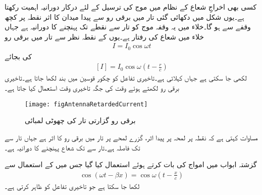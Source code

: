 کسی بھی اخراجِ شعاع کے نظام میں موج کی ترسیل کے لئے درکار دورانیہ اہمیت رکھتا ہے۔یوں شکل  میں دکھائی گئی تار میں برقی رو سے پیدا میدان کا اثر نقطہ  پر کچھ وقفے سے ہو گا۔خلاء میں یہ وقفہ موج کو تار سے نقطے تک پہنچنے کا دورانیہ  ہے جہاں
  خلاء میں  شعاع کی رفتار ہے۔یوں  کے نقطہ نظر سے تار میں برقی رو
\begin{align}
I=I_0 \cos \omega t
\end{align} 
کی بجائے
\begin{align}\label{مساوات_اینٹینا_تاخیری_رو}
[I]=I_0 \cos \omega  \left (t-\frac{r}{c} \right)
\end{align} 
لکھی جا سکتی ہے جہاں   کہلاتی ہے۔تاخیری تفاعل کو چکور قوسین میں بند لکھا جاتا ہے۔تاخیری برقی رو لکھتے ہوئے وقت  کی جگہ تاخیری وقت  استعمال کیا جاتا ہے۔

\begin{figure}
\centering
\texttt{[image: figAntennaRetardedCurrent]}
\caption{برقی رو گزارتی تار کی چھوٹی لمبائی}
\label{شکل_اینٹینا_تاخیری_رو}
\end{figure}

مساوات  کہتی ہے کہ نقطہ  پر لمحہ   پر پیدا اثر،  گزرے  لمحے  پر تار میں برقی رو کا اثر ہے جہاں تار سے  تک فاصلہ  ہے۔تار سے  تک شعاع پہنچنے کا دورانیہ  ہے۔

گزشتہ ابواب میں امواج کی بات کرتے ہوئے  استعمال کیا گیا جس میں  کے استعمال سے
\begin{align}
\cos (\omega t -\beta x)=\cos \omega\left( t- \frac{x}{c}\right)
\end{align}
لکھا جا سکتا ہے  جو تاخیری تفاعل کو ظاہر کرتی ہے۔

